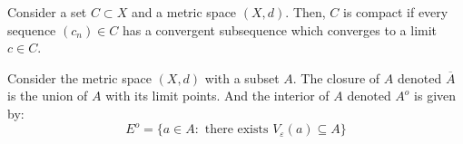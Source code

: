 
\begin{definition}[Compactness]
    Consider a set $C \subset X$ and a metric space $(X,d)$. Then, $C$ is compact if every sequence $(c_n) \in C$ has a convergent subsequence which converges to a limit $c \in C$.
\end{definition}

\begin{definition}
    Consider the metric space $(X, d)$ with a subset $A$. The closure of $A$ denoted $\overline{A}$ is the union of $A$ with its limit points. And the interior of $A$ denoted $A^{o}$ is given by:
    \begin{equation*}
        E^{o} = \{ a \in A : \text{ there exists } V_{\varepsilon}(a) \subseteq A\}
    \end{equation*}
\end{definition}